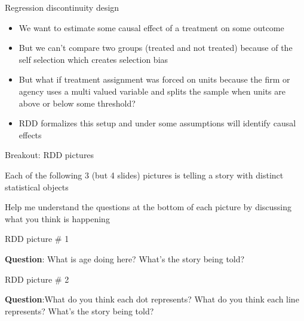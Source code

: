\documentclass{beamer}
\begin{document}
\begin{frame}{Regression discontinuity design}

	\begin{itemize}	
	\item We want to estimate some causal effect of a treatment on some outcome
	\item But we can't compare two groups (treated and not treated) because of the self selection which creates selection bias
	\item But what if treatment assignment was forced on units because the firm or agency uses a multi valued variable and splits the sample when units are above or below some threshold?
	\item RDD formalizes this setup and under some assumptions will identify causal effects
	\end{itemize}
\end{frame}

\begin{frame}{Breakout: RDD pictures}

 Each of the following 3 (but 4 slides) pictures is telling a story with distinct statistical objects

\bigskip

Help me understand the questions at the bottom of each picture by discussing what you think is happening


\end{frame}




\begin{frame}{RDD picture \# 1}
	
	\begin{figure}
	\end{figure}

\textbf{Question}: What is age doing here? What's the story being told?

\end{frame}

	
	
\begin{frame}{RDD picture \# 2}
	
	\begin{figure}
	\end{figure}

\textbf{Question}:What do you think each dot represents? What do you think each line represents? What's the story being told?
	
	
\end{frame}
\end{document}
